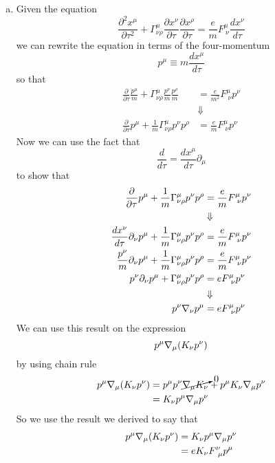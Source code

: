 \documentclass[11pt]{article}
\numberwithin{equation}{section}
\begin{document}
\begin{enumerate}[(a)]
\item
Given the equation
$$\frac{\partial^2x^{\mu}}{\partial\tau^2} + \Gamma^{\mu}_{\nu\rho}\frac{\partial x^{\nu}}{\partial\tau}\frac{\partial x^{\rho}}{\partial \tau} = \frac{e}{m}F^{\mu}_{\ \nu}\frac{dx^{\nu}}{d\tau}$$
we can rewrite the equation in terms of the four-momentum
$$p^{\mu}\equiv m\frac{dx^{\mu}}{d\tau}$$
so that
\begin{align*}
\frac{\partial}{\partial\tau}\frac{p^{\mu}}{m} + \Gamma^{\mu}_{\nu\rho}\frac{p^{\nu}}{m}\frac{p^{\rho}}{m} &= \frac{e}{m^2}F^{\mu}_{\ \nu}p^{\nu}\\
&\Downarrow\\
\frac{\partial}{\partial\tau}p^{\mu} + \frac{1}{m}\Gamma^{\mu}_{\nu\rho}p^{\nu}p^{\rho} &= \frac{e}{m}F^{\mu}_{\ \nu}p^{\nu}
\end{align*}
Now we can use the fact that
$$\frac{d}{d\tau} = \frac{dx^{\mu}}{d\tau}\partial_{\mu}$$
to show that
\begin{align*}
\frac{\partial}{\partial\tau}p^{\mu} + \frac{1}{m}\Gamma^{\mu}_{\nu\rho}p^{\nu}p^{\rho} &= \frac{e}{m}F^{\mu}_{\ \nu}p^{\nu}\\
&\Downarrow\\
\frac{dx^{\nu}}{d\tau}\partial_{\nu}p^{\mu} + \frac{1}{m}\Gamma^{\mu}_{\nu\rho}p^{\nu}p^{\rho} &= \frac{e}{m}F^{\mu}_{\ \nu}p^{\nu}\\
\frac{p^{\nu}}{m}\partial_{\nu}p^{\mu} + \frac{1}{m}\Gamma^{\mu}_{\nu\rho}p^{\nu}p^{\rho} &= \frac{e}{m}F^{\mu}_{\ \nu}p^{\nu}\\
p^{\nu}\partial_{\nu}p^{\mu} + \Gamma^{\mu}_{\nu\rho}p^{\nu}p^{\rho} &= eF^{\mu}_{\ \nu}p^{\nu}\\
&\Downarrow\\
p^{\nu}\bold\nabla_{\nu}p^{\mu} &= eF^{\mu}_{\ \nu}p^{\nu}
\end{align*}
We can use this result on the expression 
$$p^{\mu}\bold\nabla_{\mu}(K_{\nu}p^{\nu})$$
by using chain rule
\begin{align*}
p^{\mu}\bold\nabla_{\mu}(K_{\nu}p^{\nu}) &= p^{\mu}p^{\nu}\cancelto{0}{\bold\nabla_{\mu}K_{\nu}} + p^{\mu}K_{\nu}\bold\nabla_{\mu}p^{\nu}\\
&=  K_{\nu}p^{\mu}\bold\nabla_{\mu}p^{\nu}
\end{align*}
So we use the result we derived to say that
\begin{align*}
p^{\mu}\bold\nabla_{\mu}(K_{\nu}p^{\nu}) &=   K_{\nu}p^{\mu}\bold\nabla_{\mu}p^{\nu}\\
&=   eK_{\nu}F^{\nu}_{\ \mu}p^{\mu}
\end{align*}


\end{enumerate}
\end{document}
